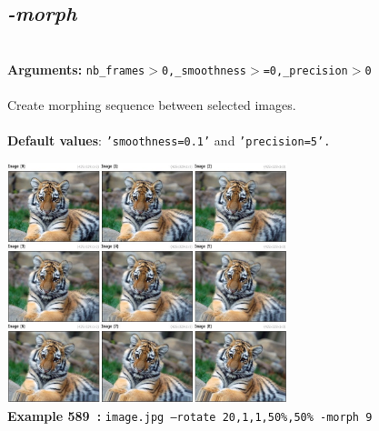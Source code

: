 \documentclass[a4paper,11pt,twoside]{book}
\begin{document}
\subsection{\emph{-morph} }\vspace*{-0.5em}
~\\\textbf{Arguments: } 
{\small \texttt{nb\_frames$>$0,\_smoothness$>$=0,\_precision$>$0}}\\~\\
Create morphing sequence between selected images.
~\\~\\\textbf{Default values}: {\small \texttt{'smoothness=0.1'} and \texttt{'precision=5'.}}
\begin{center}\includegraphics[keepaspectratio=true,height=7cm,width=\textwidth]{img/gmic_def589.jpg}\\
{\footnotesize \textbf{Example 589~:} \texttt{image.jpg --rotate 20,1,1,50\%,50\% -morph 9}}
\end{center}
\end{document}
